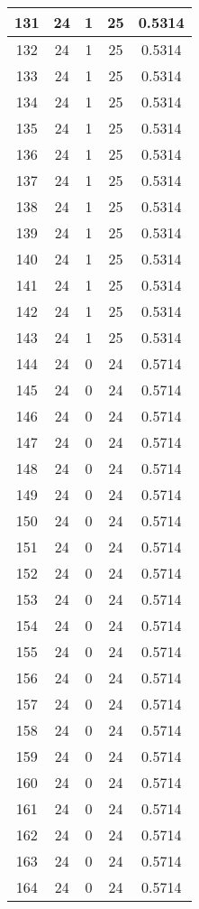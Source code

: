 \documentclass[letterpaper, 12pt]{article}
\begin{document}
\begin{longtable}{|c|c|c|c|c|}
\hline
131 & 24 & 1 & 25 & 0.5314 \\
\hline
132 & 24 & 1 & 25 & 0.5314 \\
\hline
133 & 24 & 1 & 25 & 0.5314 \\
\hline
134 & 24 & 1 & 25 & 0.5314 \\
\hline
135 & 24 & 1 & 25 & 0.5314 \\
\hline
136 & 24 & 1 & 25 & 0.5314 \\
\hline
137 & 24 & 1 & 25 & 0.5314 \\
\hline
138 & 24 & 1 & 25 & 0.5314 \\
\hline
139 & 24 & 1 & 25 & 0.5314 \\
\hline
140 & 24 & 1 & 25 & 0.5314 \\
\hline
141 & 24 & 1 & 25 & 0.5314 \\
\hline
142 & 24 & 1 & 25 & 0.5314 \\
\hline
143 & 24 & 1 & 25 & 0.5314 \\
\hline
144 & 24 & 0 & 24 & 0.5714 \\
\hline
145 & 24 & 0 & 24 & 0.5714 \\
\hline
146 & 24 & 0 & 24 & 0.5714 \\
\hline
147 & 24 & 0 & 24 & 0.5714 \\
\hline
148 & 24 & 0 & 24 & 0.5714 \\
\hline
149 & 24 & 0 & 24 & 0.5714 \\
\hline
150 & 24 & 0 & 24 & 0.5714 \\
\hline
151 & 24 & 0 & 24 & 0.5714 \\
\hline
152 & 24 & 0 & 24 & 0.5714 \\
\hline
153 & 24 & 0 & 24 & 0.5714 \\
\hline
154 & 24 & 0 & 24 & 0.5714 \\
\hline
155 & 24 & 0 & 24 & 0.5714 \\
\hline
156 & 24 & 0 & 24 & 0.5714 \\
\hline
157 & 24 & 0 & 24 & 0.5714 \\
\hline
158 & 24 & 0 & 24 & 0.5714 \\
\hline
159 & 24 & 0 & 24 & 0.5714 \\
\hline
160 & 24 & 0 & 24 & 0.5714 \\
\hline
161 & 24 & 0 & 24 & 0.5714 \\
\hline
162 & 24 & 0 & 24 & 0.5714 \\
\hline
163 & 24 & 0 & 24 & 0.5714 \\
\hline
164 & 24 & 0 & 24 & 0.5714 \\

\end{longtable}
\end{document}
